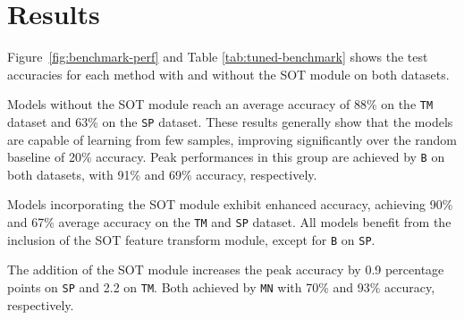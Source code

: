 \section{Results}



Figure~\ref{fig:benchmark-perf} and Table \ref{tab:tuned-benchmark} shows the test accuracies for each method with and without the SOT module on both datasets.

Models without the SOT module reach an average accuracy of 88\% on the \texttt{TM} dataset and 63\% on the \texttt{SP} dataset. These results generally show that the models are capable of learning from few samples, improving significantly over the random baseline of 20\% accuracy. Peak performances in this group are achieved by \texttt{B} on both datasets, with 91\% and 69\% accuracy, respectively.

Models incorporating the SOT module exhibit enhanced accuracy, achieving 90\% and 67\% average accuracy on the \texttt{TM} and \texttt{SP} dataset. All models benefit from the inclusion of the SOT feature transform module, except for \texttt{B} on \texttt{SP}. 

The addition of the SOT module increases the peak accuracy by 0.9 percentage points on \texttt{SP} and 2.2 on \texttt{TM}. Both achieved by \texttt{MN} with 70\% and 93\% accuracy, respectively.

